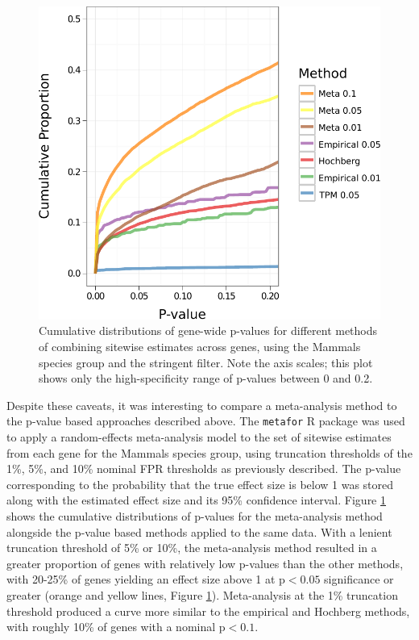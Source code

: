 \begin{figure}
\centering \scriptsize
\includegraphics[scale=0.8]{Figs/meta_pvals.pdf}
\caption{Cumulative distributions of gene-wide p-values for different
  methods of combining sitewise estimates across genes, using the
  Mammals species group and the stringent filter. Note the axis
  scales; this plot shows only the high-specificity range of p-values
  between 0 and 0.2.}
\label{fig_meta_pvals}
\end{figure}

Despite these caveats, it was interesting to compare a meta-analysis
method to the p-value based approaches described above. The
\texttt{metafor} R package \citep{Viechtbauer2010} was used to apply a
random-effects meta-analysis model to the set of sitewise estimates
from each gene for the Mammals species group, using truncation
thresholds of the 1\%, 5\%, and 10\% nominal FPR thresholds as
previously described. The p-value corresponding to the probability
that the true effect size is below 1 was stored along with the
estimated effect size and its 95\% confidence interval. Figure
\ref{fig_meta_pvals} shows the cumulative distributions of p-values
for the meta-analysis method alongside the p-value based methods
applied to the same data. With a lenient truncation threshold of 5\%
or 10\%, the meta-analysis method resulted in a greater proportion of
genes with relatively low p-values than the other methods, with
20-25\% of genes yielding an effect size above 1 at p$<0.05$
significance or greater (orange and yellow lines, Figure
\ref{fig_meta_pvals}). Meta-analysis at the 1\% truncation threshold
produced a curve more similar to the empirical and Hochberg methods,
with roughly 10\% of genes with a nominal p$<0.1$.

